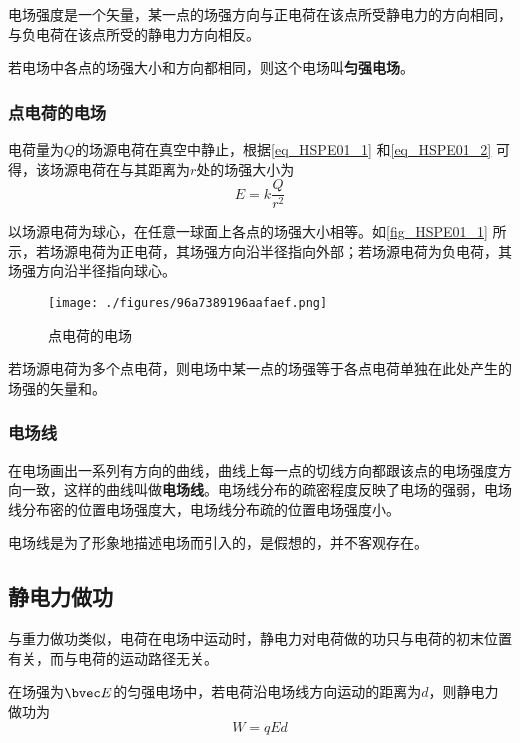 电场强度是一个矢量，某一点的场强方向与正电荷在该点所受静电力的方向相同，与负电荷在该点所受的静电力方向相反。

若电场中各点的场强大小和方向都相同，则这个电场叫\textbf{匀强电场}。

\subsubsection{点电荷的电场}

电荷量为$Q$的场源电荷在真空中静止，根据\autoref{eq_HSPE01_1} 和\autoref{eq_HSPE01_2} 可得，该场源电荷在与其距离为$r$处的场强大小为
\begin{equation}
E=k\frac{Q}{r^2}
\end{equation}

以场源电荷为球心，在任意一球面上各点的场强大小相等。如\autoref{fig_HSPE01_1} 所示，若场源电荷为正电荷，其场强方向沿半径指向外部；若场源电荷为负电荷，其场强方向沿半径指向球心。

\begin{figure}[ht]
\centering
\texttt{[image: ./figures/96a7389196aafaef.png]}
\caption{点电荷的电场} \label{fig_HSPE01_1}
\end{figure}

若场源电荷为多个点电荷，则电场中某一点的场强等于各点电荷单独在此处产生的场强的矢量和。

\subsubsection{电场线}

在电场画出一系列有方向的曲线，曲线上每一点的切线方向都跟该点的电场强度方向一致，这样的曲线叫做\textbf{电场线}。电场线分布的疏密程度反映了电场的强弱，电场线分布密的位置电场强度大，电场线分布疏的位置电场强度小。

电场线是为了形象地描述电场而引入的，是假想的，并不客观存在。

\subsection{静电力做功}

与重力做功类似，电荷在电场中运动时，静电力对电荷做的功只与电荷的初末位置有关，而与电荷的运动路径无关。

在场强为$\bvec E$的匀强电场中，若电荷沿电场线方向运动的距离为$d$，则静电力做功为
\begin{equation}\label{eq_HSPE01_5}
W=qEd
\end{equation}

